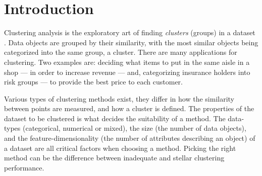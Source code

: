 \documentclass[../report.tex]{subfiles}
\begin{document}
\chapter{Introduction}


Clustering analysis is the exploratory art of finding \textit{clusters} (groups) in a dataset \cite{Kaufman1990}. Data objects are grouped by their similarity, with the most similar objects being categorized into the same group, a cluster. There are many applications for clustering. Two examples are: deciding what items to put in the same aisle in a shop --- in order to increase revenue --- and, categorizing insurance holders into risk groups --- to provide the best price to each customer.




Various types of clustering methods exist, they differ in how the similarity between points are measured, and how a cluster is defined.
The properties of the dataset to be clustered is what decides the suitability of a method. The data-types (categorical, numerical or mixed), the size (the number of data objects), and the feature-dimensionality (the number of attributes describing an object) of a dataset are all critical factors when choosing a method. Picking the right method can be the difference between inadequate and stellar  clustering performance.
\end{document}
